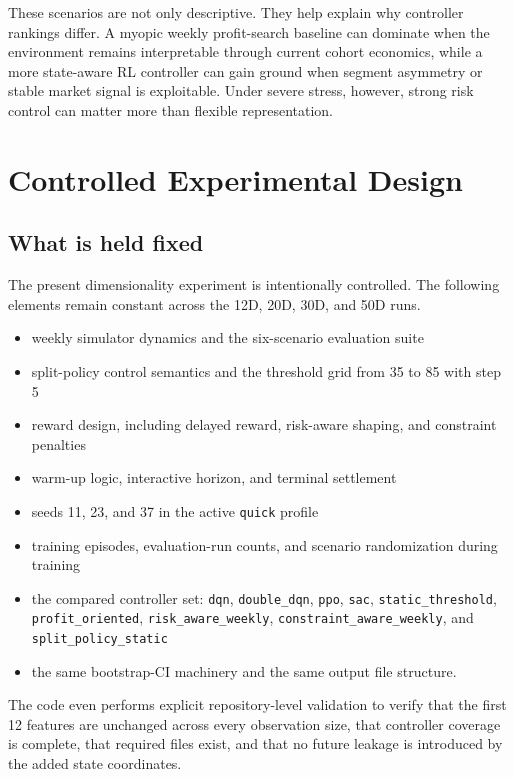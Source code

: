 \documentclass[12pt,a4paper]{article}
\begin{document}
These scenarios are not only descriptive. They help explain why controller rankings differ. A myopic weekly profit-search baseline can dominate when the environment remains interpretable through current cohort economics, while a more state-aware RL controller can gain ground when segment asymmetry or stable market signal is exploitable. Under severe stress, however, strong risk control can matter more than flexible representation.

\section{Controlled Experimental Design}

\subsection{What is held fixed}

The present dimensionality experiment is intentionally controlled. The following elements remain constant across the 12D, 20D, 30D, and 50D runs.
\begin{itemize}[leftmargin=*]
    \item weekly simulator dynamics and the six-scenario evaluation suite
    \item split-policy control semantics and the threshold grid from 35 to 85 with step 5
    \item reward design, including delayed reward, risk-aware shaping, and constraint penalties
    \item warm-up logic, interactive horizon, and terminal settlement
    \item seeds 11, 23, and 37 in the active \texttt{quick} profile
    \item training episodes, evaluation-run counts, and scenario randomization during training
    \item the compared controller set: \texttt{dqn}, \texttt{double\_dqn}, \texttt{ppo}, \texttt{sac}, \texttt{static\_threshold}, \texttt{profit\_oriented}, \texttt{risk\_aware\_weekly}, \texttt{constraint\_aware\_weekly}, and \texttt{split\_policy\_static}
    \item the same bootstrap-CI machinery and the same output file structure.
\end{itemize}

The code even performs explicit repository-level validation to verify that the first 12 features are unchanged across every observation size, that controller coverage is complete, that required files exist, and that no future leakage is introduced by the added state coordinates.
\end{document}
